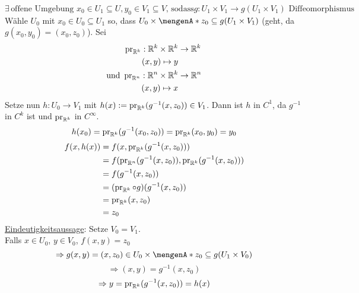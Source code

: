 \[
	\exists\, \text{offene Umgebung }x_0 \in U_1 \subseteq U, y_0 \in V_1 \subseteq V \text{, sodass} g: U_1 \times V_1 \to g(U_1 \times V_1) \text{ Diffeomorphismus}
\]
Wähle $U_0$ mit $x_0 \in U_0 \subseteq U_1$ so, dass $U_0 \times \set{z_0} \subseteq g(U_1 \times V_1)$ (geht, da $g(x_0,y_0)=(x_0,z_0)$).
Sei \begin{align*}
	\operatorname{pr}_{\mathbb{R}^k}: \mathbb{R}^k \times \mathbb{R}^k &\to \mathbb{R}^k \\
	(x,y) \mapsto y \\
	\text{und } \operatorname{pr}_{\mathbb{R}^n}: \mathbb{R}^n \times \mathbb{R}^k &\to \mathbb{R}^n \\
	(x,y) \mapsto x
\end{align*}  
Setze nun $h:U_0 \to V_1$ mit $h(x):= \operatorname{pr}_{\mathbb{R}^k}(g^{-1}(x,z_0)) \in V_1$. Dann ist $h$ in $C^1$, da $g^{-1}$ in $C^k$ ist und $\operatorname{pr}_{\mathbb{R}^k}$ in $C^{\infty}$. \\
\[
	h(x_0)= \operatorname{pr}_{\mathbb{R}^k}(g^{-1}(x_0,z_0)) = \operatorname{pr}_{\mathbb{R}^k}(x_0,y_0)=y_0
\]
\begin{align*}
	f(x,h(x)) &= f(x, \operatorname{pr}_{\mathbb{R}^k}(g^{-1}(x,z_0))) \\
	&= f(\operatorname{pr}_{\mathbb{R}^n}(g^{-1}(x,z_0)),\operatorname{pr}_{\mathbb{R}^k}(g^{-1}(x,z_0))) \\
	&= f(g^{-1}(x,z_0)) \\
	&= (\operatorname{pr}_{\mathbb{R}^k} \circ g)(g^{-1}(x,z_0)) \\
	&= \operatorname{pr}_{\mathbb{R}^k}(x,z_0) \\
	&= z_0
\end{align*}
\underline{Eindeutigkeitsaussage}:
Setze $V_0=V_1$. \\
Falls $x \in U_0$, $y \in V_0$, $f(x,y)=z_0$
\[
	\Rightarrow g(x,y)= (x,z_0) \in U_0 \times \set{z_0} \subseteq g(U_1 \times V_0)
\]
\[
	\Rightarrow (x,y)= g^{-1}(x,z_0)
\]
\[
	\Rightarrow y = \operatorname{pr}_{\mathbb{R}^k}(g^{-1}(x,z_0))=h(x)
\] \bewende

